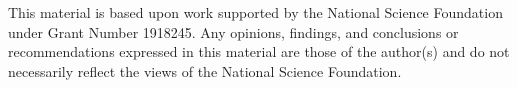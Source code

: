  
This material is based upon work supported by the National Science Foundation under Grant Number 1918245. Any opinions, findings, and conclusions or recommendations expressed in this material are those of the author(s) and do not necessarily reflect the views of the National Science Foundation.

